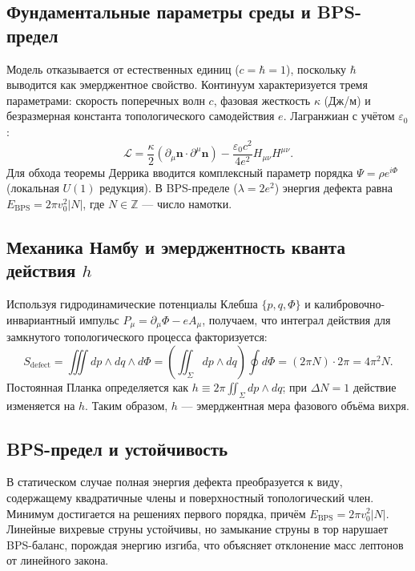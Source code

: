\documentclass[11pt,a4paper]{article}
\begin{document}
	\subsection{Фундаментальные параметры среды и BPS-предел}
	Модель отказывается от естественных единиц ($c=\hbar=1$), поскольку $\hbar$ выводится как эмерджентное свойство. Континуум характеризуется тремя параметрами: скорость поперечных волн $c$, фазовая жесткость $\kappa$ (Дж/м) и безразмерная константа топологического самодействия $e$. Лагранжиан с учётом $\varepsilon_0$:
	\begin{equation}
		\mathcal{L} = \frac{\kappa}{2} (\partial_\mu \mathbf{n} \cdot \partial^\mu \mathbf{n}) - \frac{\varepsilon_0 c^2}{4 e^2} H_{\mu\nu} H^{\mu\nu}.
		\label{eq:lagrangian}
	\end{equation}
	Для обхода теоремы Деррика вводится комплексный параметр порядка $\Psi=\rho e^{i\Phi}$ (локальная $U(1)$ редукция). В BPS-пределе ($\lambda=2e^2$) энергия дефекта равна $E_{\text{BPS}}=2\pi v_0^2|N|$, где $N\in\mathbb{Z}$ — число намотки.
	
	\subsection{Механика Намбу и эмерджентность кванта действия $h$}
	Используя гидродинамические потенциалы Клебша $\{p,q,\Phi\}$ и калибровочно-инвариантный импульс $P_\mu=\partial_\mu\Phi-eA_\mu$, получаем, что интеграл действия для замкнутого топологического процесса факторизуется:
	\begin{equation}
		S_{\text{defect}} = \iiint dp\wedge dq\wedge d\Phi = \left(\iint_\Sigma dp\wedge dq\right)\oint d\Phi = (2\pi N)\cdot 2\pi = 4\pi^2 N.
	\end{equation}
	Постоянная Планка определяется как $h \equiv 2\pi\iint_\Sigma dp\wedge dq$; при $\Delta N=1$ действие изменяется на $h$. Таким образом, $h$ — эмерджентная мера фазового объёма вихря.
	
	\subsection{BPS-предел и устойчивость}
	В статическом случае полная энергия дефекта преобразуется к виду, содержащему квадратичные члены и поверхностный топологический член. Минимум достигается на решениях первого порядка, причём $E_{\text{BPS}}=2\pi v_0^2|N|$. Линейные вихревые струны устойчивы, но замыкание струны в тор нарушает BPS-баланс, порождая энергию изгиба, что объясняет отклонение масс лептонов от линейного закона.
	
\end{document}

